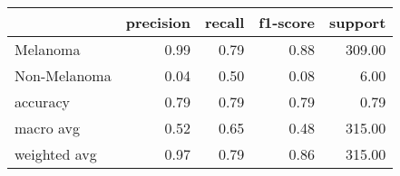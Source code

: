 \begin{tabular}{lrrrr}
\toprule
 & precision & recall & f1-score & support \\
\midrule
Melanoma & 0.99 & 0.79 & 0.88 & 309.00 \\
Non-Melanoma & 0.04 & 0.50 & 0.08 & 6.00 \\
accuracy & 0.79 & 0.79 & 0.79 & 0.79 \\
macro avg & 0.52 & 0.65 & 0.48 & 315.00 \\
weighted avg & 0.97 & 0.79 & 0.86 & 315.00 \\
\bottomrule
\end{tabular}
